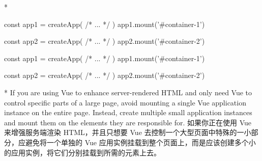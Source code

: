 \begin{paracol}{2}
\switchcolumn[0]*%
\begin{codeJs}
const app1 = createApp({
    /* ... */
})
app1.mount('#container-1')

const app2 = createApp({
    /* ... */
})
app2.mount('#container-2')
\end{codeJs}
\switchcolumn
\begin{codeJs}
const app1 = createApp({
    /* ... */
})
app1.mount('#container-1')

const app2 = createApp({
    /* ... */
})
app2.mount('#container-2')
\end{codeJs}

\switchcolumn[0]*%
If you are using Vue to enhance server-rendered HTML and only need Vue
to control specific parts of a large page, avoid mounting a single Vue
application instance on the entire page. Instead, create multiple small
application instances and mount them on the elements they are
responsible for.
\switchcolumn
如果你正在使用 Vue 来增强服务端渲染 HTML，并且只想要 Vue
去控制一个大型页面中特殊的一小部分，应避免将一个单独的 Vue
应用实例挂载到整个页面上，而是应该创建多个小的应用实例，将它们分别挂载到所需的元素上去。
\end{paracol}
